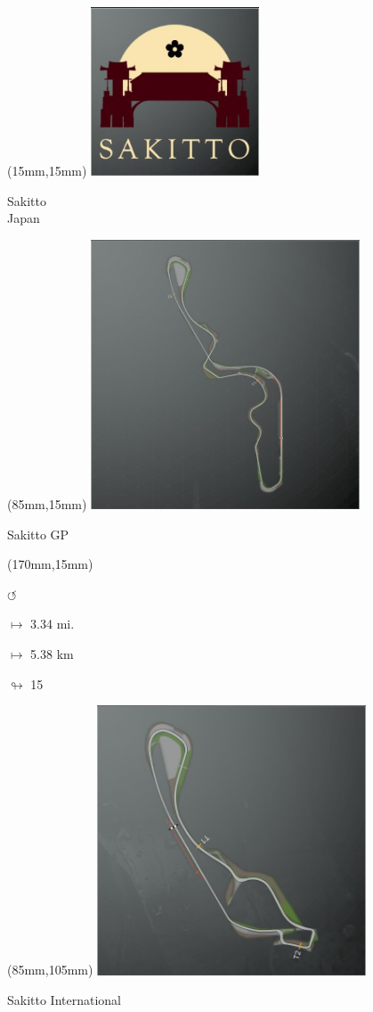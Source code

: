 \begin{textblock*}{60mm}(15mm,15mm)%
\includegraphics[width=50mm]{LG/2015-05-20_00093.png}
\par Sakitto\\ Japan
\end{textblock*}
\begin{textblock*}{80mm}(85mm,15mm)%
\includegraphics[width=80mm]{TR/2015-05-20_00052.png}
\centerline{Sakitto GP}
\end{textblock*}
\begin{textblock*}{30mm}(170mm,15mm)%
\par \Huge$\circlearrowleft$
\Large
\par$\mapsto$ 3.34 mi.
\par$\mapsto$ 5.38 km
\par$\looparrowright$ 15
\end{textblock*}
\begin{textblock*}{80mm}(85mm,105mm)%
\includegraphics[width=80mm]{TR/2015-05-20_00055.png}
\centerline{Sakitto International}
\end{textblock*}
